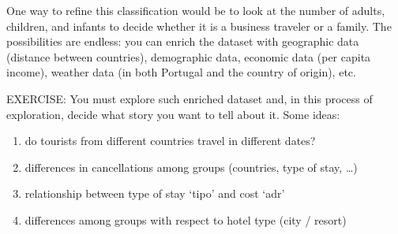 \documentclass[
]{article}
\newenvironment{Shaded}{\begin{snugshade}}{\end{snugshade}}
\newcommand{\CommentTok}[1]{\textcolor[rgb]{0.56,0.35,0.01}{\textit{#1}}}
\newcommand{\DecValTok}[1]{\textcolor[rgb]{0.00,0.00,0.81}{#1}}
\newcommand{\FunctionTok}[1]{\textcolor[rgb]{0.13,0.29,0.53}{\textbf{#1}}}
\newcommand{\NormalTok}[1]{#1}
\newcommand{\OtherTok}[1]{\textcolor[rgb]{0.56,0.35,0.01}{#1}}
\newcommand{\SpecialCharTok}[1]{\textcolor[rgb]{0.81,0.36,0.00}{\textbf{#1}}}
\newcommand{\StringTok}[1]{\textcolor[rgb]{0.31,0.60,0.02}{#1}}
\providecommand{\tightlist}{%
  \setlength{\itemsep}{0pt}\setlength{\parskip}{0pt}}
\begin{document}
\begin{Shaded}
\end{Shaded}

One way to refine this classification would be to look at the number of
adults, children, and infants to decide whether it is a business
traveler or a family. The possibilities are endless: you can enrich the
dataset with geographic data (distance between countries), demographic
data, economic data (per capita income), weather data (in both Portugal
and the country of origin), etc.

EXERCISE: You must explore such enriched dataset and, in this process of
exploration, decide what story you want to tell about it. Some ideas:

\begin{enumerate}
\def\labelenumi{\arabic{enumi})}
\tightlist
\item
  do tourists from different countries travel in different dates?
\item
  differences in cancellations among groups (countries, type of stay,
  \ldots)
\item
  relationship between type of stay `tipo' and cost `adr'
\item
  differences among groups with respect to hotel type (city / resort)
\end{enumerate}
\end{document}
